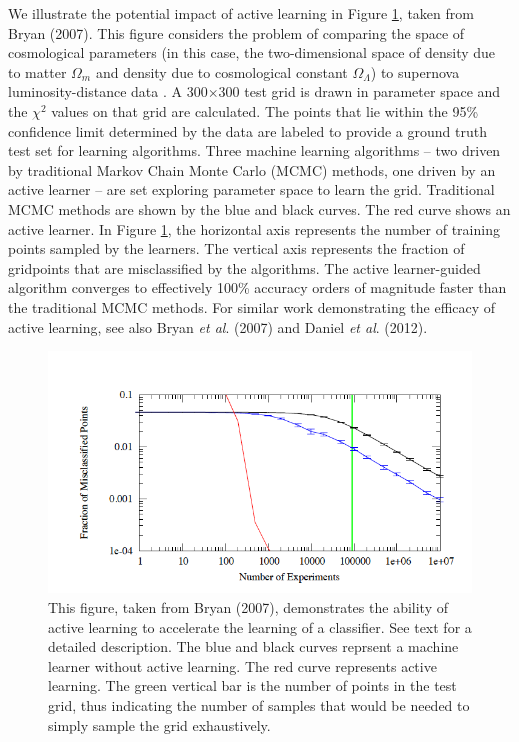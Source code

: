 \documentclass[prd, nofootinbib, floatfix, 12pt,tightenlines]{revtex4}
\begin{document}
We illustrate the potential impact of active learning in Figure
\ref{brentfig}, taken from Bryan (2007).  This figure considers the problem
of comparing the space of cosmological parameters (in this case, the
two-dimensional space of density due to matter $\Omega_m$ and density due
to cosmological constant $\Omega_\Lambda$) to supernova luminosity-distance
data \cite{essence}.  A 300$\times$300 test grid is drawn in parameter
space and the $\chi^2$ values on that grid are calculated.  The points that
lie within the 95\% confidence limit determined by the data are labeled to
provide a ground truth test set for learning algorithms. 
Three machine learning algorithms -- two driven by traditional Markov Chain Monte Carlo
(MCMC) methods, one driven by an active learner -- are set exploring parameter space to
learn the grid.
Traditional MCMC methods are shown by the blue and black curves.  The red
curve shows an active learner.  In Figure \ref{brentfig}, the horizontal
axis represents the number of training points sampled by the learners.  The
vertical axis represents the fraction of gridpoints that are misclassified
by the algorithms.
The active learner-guided algorithm converges to effectively 100\% accuracy
orders of magnitude faster than the traditional MCMC methods.  For similar
work demonstrating the efficacy of active learning, see also Bryan {\it et
  al}. (2007) and Daniel {\it et al}. (2012).

\begin{figure}[t]
\centerline{\includegraphics[scale=0.4]{apsvmcmc.png}}
\caption{This figure, taken from Bryan (2007), demonstrates the ability of
  active learning to accelerate the learning of a classifier. See text for
  a detailed description. The blue and black curves reprsent a machine
  learner without active learning. The red curve represents active
  learning. The green vertical bar is the number of points in the test
  grid, thus indicating the number of samples that would be needed to
  simply sample the grid exhaustively. }
\label{brentfig}
\end{figure}
\end{document}
